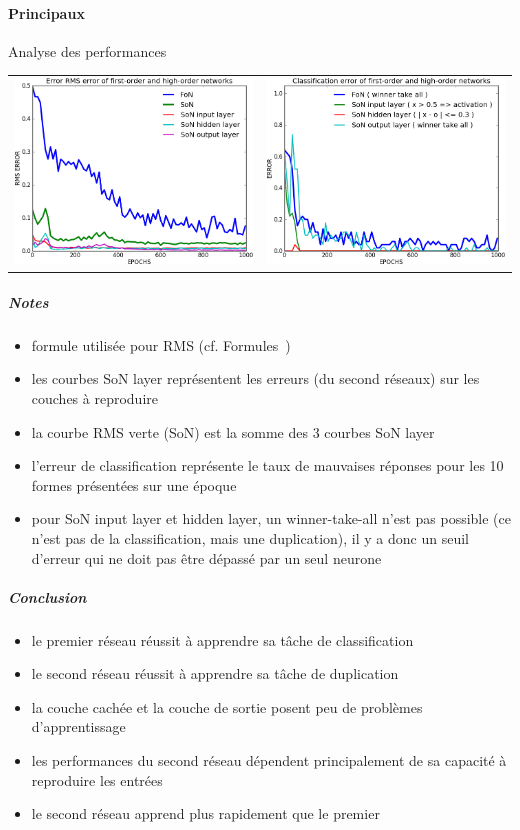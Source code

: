     \paragraph{Principaux}
      Analyse des performances
      \begin{center}
	\begin{tabular}{lr}
	  \hspace*{-1cm}
	  \includegraphics[width=250px]{data/expA4/rms.png}
	  &
	  \includegraphics[width=250px]{data/expA4/err.png} 
	\end{tabular}
      \end{center}
      \subparagraph{Notes}
	\begin{itemize}
	  \item formule utilisée pour RMS (cf. Formules~)
	  \item les courbes SoN layer représentent les erreurs (du second réseaux) sur les couches à reproduire 
	  \item la courbe RMS verte (SoN) est la somme des 3 courbes SoN layer
	  \item l'erreur de classification représente le taux de mauvaises réponses pour les 10 formes présentées sur une époque
	  \item pour SoN input layer et hidden layer, un winner-take-all n'est pas possible (ce n'est pas de la classification, 
	  mais une duplication), il y a donc un seuil d'erreur qui ne doit pas être dépassé par un seul neurone
	\end{itemize}
      \subparagraph{Conclusion}
	\begin{itemize}
	  \item le premier réseau réussit à apprendre sa tâche de classification
	  \item le second réseau réussit à apprendre sa tâche de duplication
	  \item la couche cachée et la couche de sortie posent peu de problèmes d'apprentissage
	  \item les performances du second réseau dépendent principalement de sa capacité à reproduire les entrées
	  \item le second réseau apprend plus rapidement que le premier
	\end{itemize}
